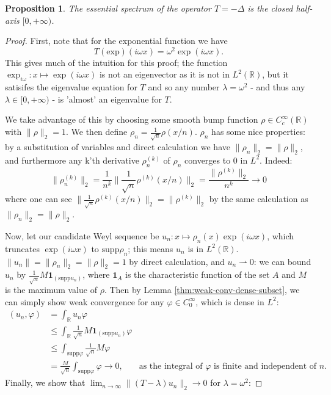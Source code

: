 \documentclass{article}
\newtheorem{proposition}{Proposition}
\newcommand{\supp}{\text{supp}}
\newcommand{\1}{\mathbf{1}}
\begin{document}
\begin{proposition}
The essential spectrum of the operator $T = -\Delta$ is the closed half-axis $[0, +\infty)$.
\end{proposition}
\begin{proof}
First, note that for the exponential function we have 
\begin{equation}\label{eqn:laplace-eigenvector}
T(\text{exp})(i\omega x) = \omega^2 \exp(i\omega x).
\end{equation}
This gives much of the intuition for this proof; the function $\exp_{i \omega}: x \mapsto \exp(i\omega x)$ is not an eigenvector 
as it is not in $L^2(\mathbb{R})$, but it satisifes the eigenvalue equation for $T$ and so any number $\lambda = \omega^2$ -
and thus any $\lambda \in [0, +\infty)$ - is 'almost' an eigenvalue for $T$.

We take advantage of this by choosing some smooth bump function $\rho \in C^\infty_c(\mathbb{R})$ with $\|\rho\|_2 = 1$. We
then define $\rho_n = \frac{1}{\sqrt{n}}\rho(x/n)$. $\rho_n$ has some nice properties: by a substitution of variables and direct calculation we have $\|\rho_n\|_2 = \|\rho\|_2$, and furthermore any k'th derivative $\rho_n^{(k)}$ of $\rho_n$ 
converges to 0 in $L^2$. Indeed:
\begin{equation}\label{eqn:rhokn-vanishes}
\|\rho_n^{(k)}\|_2 = \frac{1}{n^k}\|\frac{1}{\sqrt{n}}\rho^{(k)}(x/n)\|_2 = \frac{\|\rho^{(k)}\|_2}{n^k} \rightarrow 0
\end{equation}
where one can see $\|\frac{1}{\sqrt{n}}\rho^{(k)}(x/n)\|_2 = \|\rho^{(k)}\|_2$ by the same calculation as  $\|\rho_n\|_2 = \|\rho\|_2$.

Now, let our candidate Weyl sequence be $u_n: x \mapsto \rho_n(x)\exp(i\omega x)$,
which truncates $\exp(i\omega x)$ to $\supp \rho_n$; this means $u_n$ is in $L^2(\mathbb{R})$.
$\|u_n\| = \|\rho_n\|_2 = \|\rho\|_2 = 1$ by direct calculation, and $u_n \rightharpoonup 0$: we can bound $u_n$ by $\frac{1}{\sqrt{n}} M \1_{(\supp u_n)}$, where $\1_A$ is the characteristic function of the set $A$ and $M$ is the maximum value of $\rho$. Then by Lemma \ref{thm:weak-conv-dense-subset}, we can simply show weak convergence for any $\varphi \in C_0^\infty$, which is dense in $L^2$:
\begin{align*}
( u_n, \varphi ) & = \int_{\mathbb{R}}u_n \varphi & \\
& \leq \int_{\mathbb{R}} \frac{1}{\sqrt{n}} M \1_{(\supp u_n)} \varphi & \\
& \leq \int_{\supp \varphi} \frac{1}{\sqrt{n}} M  \varphi & \\
& = \frac{M}{\sqrt{n}} \int_{\supp \varphi} \varphi \rightarrow 0, & \text{as the integral of $\varphi$ is finite and independent of $n$.}
\end{align*}
Finally, we show that $\lim_{n \rightarrow \infty}\|(T - \lambda)u_n\|_2  \rightarrow 0$ for $\lambda = \omega^2$:


\end{proof}
\end{document}
